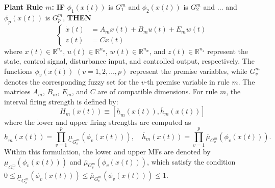 \documentclass[preprint,review,fleqn,sort&compress,3p]{elsarticle}
\theoremstyle{definition} %
\theoremstyle{definition}%
\begin{document}
	\textbf{Plant Rule $m$:} 
	\textbf{IF} $\phi_1(x(t))$ is $G^{m}_1$ and $\phi_2(x(t))$ is $G^{m}_2$ and $\ldots$ and $\phi_p(x(t))$ is $G^{m}_p$, \textbf{THEN}
	\begin{equation}\label{eq:state_system}
		\left\{
		\begin{aligned}
			\dot{x}(t) &= A_{m} x(t) + B_{m} u(t) + E_{m} w(t) \\
			z(t) &= C x(t)
		\end{aligned}
		\right.
	\end{equation}
	where $x(t)\in\mathbb{R}^{n_x}$, $u(t)\in\mathbb{R}^{n_u}$,
	$w(t)\in\mathbb{R}^{n_w}$, and $z(t)\in\mathbb{R}^{n_z}$
	represent the state, control signal, disturbance input, and controlled output, respectively.
	The functions $\phi_v(x(t))$ $(v=1,2,\ldots,p)$ represent the premise variables, while $G_v^m$ denotes the corresponding fuzzy set for the $v$-th premise variable in rule $m$.
	The matrices $A_m$, $B_m$, $E_m$, and $C$ are of compatible dimensions.
	For rule $m$, the interval firing strength is defined by:
	\begin{equation}
		H_m(x(t)) \equiv \left[ \underline{h}_m(x(t)), \overline{h}_m(x(t)) \right]
	\end{equation} 
	where the lower and upper firing strengths are computed as
	\begin{equation}
		\underline{h}_m(x(t)) = \prod_{v=1}^{p} \underline{\mu}_{G^m_{v}}(\phi_v(x(t))),
		\quad
		\overline{h}_m(x(t)) = \prod_{v=1}^{p} \overline{\mu}_{G^m_{v}}(\phi_v(x(t))).
	\end{equation}
	Within this formulation, the lower and upper MFs are denoted by $\underline{\mu}_{G^m_{v}}(\phi_v(x(t)))$ and $\overline{\mu}_{G^m_{v}}(\phi_v(x(t)))$, which satisfy the condition $0 \le \underline{\mu}_{G^m_{v}}(\phi_v(x(t))) \le \overline{\mu}_{G^m_{v}}(\phi_v(x(t))) \le 1$.
	
\end{document}
